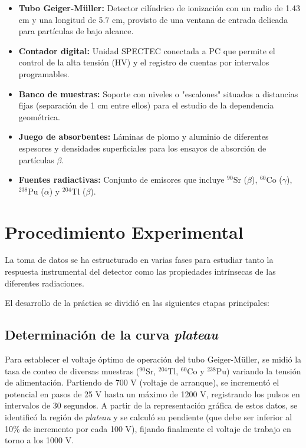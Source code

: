 \documentclass[9pt,a4paper,twocolumn,twoside]{rho-class/rho}
\begin{document}
\begin{itemize}
    \item \textbf{Tubo Geiger-Müller:} Detector cilíndrico de ionización con un radio de 1.43 cm y una longitud de 5.7 cm, provisto de una ventana de entrada delicada para partículas de bajo alcance. %
    \item \textbf{Contador digital:} Unidad SPECTEC conectada a PC que permite el control de la alta tensión (HV) y el registro de cuentas por intervalos programables. %
    \item \textbf{Banco de muestras:} Soporte con niveles o "escalones" situados a distancias fijas (separación de 1 cm entre ellos) para el estudio de la dependencia geométrica. %
    \item \textbf{Juego de absorbentes:} Láminas de plomo y aluminio de diferentes espesores y densidades superficiales para los ensayos de absorción de partículas $\beta$. %
    \item \textbf{Fuentes radiactivas:} Conjunto de emisores que incluye $^{90}\text{Sr}$ ($\beta$), $^{60}\text{Co}$ ($\gamma$), $^{238}\text{Pu}$ ($\alpha$) y $^{204}\text{Tl}$ ($\beta$). %
\end{itemize}

\section{Procedimiento Experimental}

La toma de datos se ha estructurado en varias fases para estudiar tanto la respuesta instrumental del detector como las propiedades intrínsecas de las diferentes radiaciones. %

El desarrollo de la práctica se dividió en las siguientes etapas principales:

\subsection{Determinación de la curva \textit{plateau}}
Para establecer el voltaje óptimo de operación del tubo Geiger-Müller, se midió la tasa de conteo de diversas muestras ($^{90}\text{Sr}$, $^{204}\text{Tl}$, $^{60}\text{Co}$ y $^{238}\text{Pu}$) variando la tensión de alimentación. %
Partiendo de 700 V (voltaje de arranque), se incrementó el potencial en pasos de 25 V hasta un máximo de 1200 V, registrando los pulsos en intervalos de 30 segundos. %
A partir de la representación gráfica de estos datos, se identificó la región de \textit{plateau} y se calculó su pendiente (que debe ser inferior al 10\% de incremento por cada 100 V), fijando finalmente el voltaje de trabajo en torno a los 1000 V. %
\end{document}
